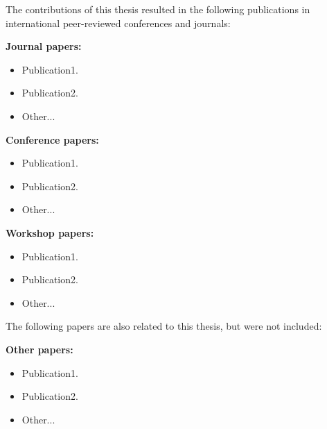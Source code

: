 \thispagestyle{plain}

The contributions of this thesis resulted in the following publications in international peer-reviewed conferences and journals:

\textbf{Journal papers:}
\begin{itemize}
	\item Publication1.
	\item Publication2.
	\item Other...
\end{itemize}

\textbf{Conference papers:}
\begin{itemize}
	\item Publication1.
	\item Publication2.
	\item Other...
\end{itemize}

\textbf{Workshop papers:}
\begin{itemize}
	\item Publication1.
	\item Publication2.
	\item Other...
\end{itemize}

The following papers are also related to this thesis, but were not included:

\textbf{Other papers:}
\begin{itemize}
	\item Publication1.
	\item Publication2.
	\item Other...
\end{itemize}
